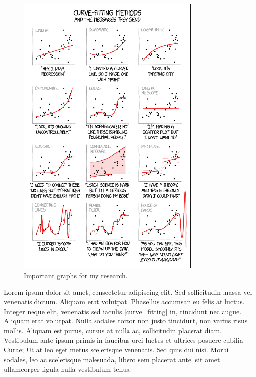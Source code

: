 \begin{figure}[!h]
	\includegraphics[width=0.8\textwidth]{plots/curve_fitting}
	\centering
	\caption{Important graphs for my research.}
	\centering
	\label{fig:curve_fitting}
\end{figure}

Lorem ipsum dolor sit amet, consectetur adipiscing elit. Sed sollicitudin massa vel venenatis dictum. Aliquam erat volutpat. Phasellus accumsan eu felis at luctus. Integer neque elit, venenatis sed iaculis \cref{curve_fitting} in, tincidunt nec augue. Aliquam erat volutpat. Nulla sodales tortor non justo tincidunt, non varius risus mollis. Aliquam est purus, cursus at nulla ac, sollicitudin placerat diam. Vestibulum ante ipsum primis in faucibus orci luctus et ultrices posuere cubilia Curae; Ut at leo eget metus scelerisque venenatis. Sed quis dui nisi. Morbi sodales, leo ac scelerisque malesuada, libero sem placerat ante, sit amet ullamcorper ligula nulla vestibulum tellus.

